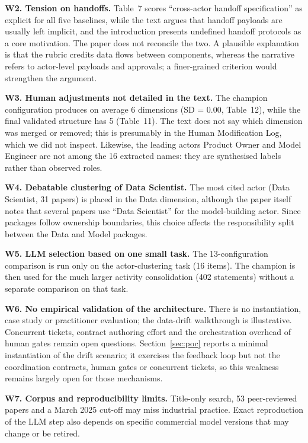 \documentclass[11pt,a4paper]{article}
\begin{document}
\textbf{W2. Tension on handoffs.} Table~7 scores ``cross-actor handoff specification'' as explicit for all five baselines, while the text argues that handoff payloads are usually left implicit, and the introduction presents undefined handoff protocols as a core motivation. The paper does not reconcile the two. A plausible explanation is that the rubric credits data flows between components, whereas the narrative refers to actor-level payloads and approvals; a finer-grained criterion would strengthen the argument.

\textbf{W3. Human adjustments not detailed in the text.} The champion configuration produces on average 6 dimensions (SD = 0.00, Table~12), while the final validated structure has 5 (Table~11). The text does not say which dimension was merged or removed; this is presumably in the Human Modification Log, which we did not inspect. Likewise, the leading actors Product Owner and Model Engineer are not among the 16 extracted names: they are synthesised labels rather than observed roles.

\textbf{W4. Debatable clustering of Data Scientist.} The most cited actor (Data Scientist, 31 papers) is placed in the Data dimension, although the paper itself notes that several papers use ``Data Scientist'' for the model-building actor. Since packages follow ownership boundaries, this choice affects the responsibility split between the Data and Model packages.

\textbf{W5. LLM selection based on one small task.} The 13-configuration comparison is run only on the actor-clustering task (16 items). The champion is then used for the much larger activity consolidation (402 statements) without a separate comparison on that task.

\textbf{W6. No empirical validation of the architecture.} There is no instantiation, case study or practitioner evaluation; the data-drift walkthrough is illustrative. Concurrent tickets, contract authoring effort and the orchestration overhead of human gates remain open questions.
Section~\ref{sec:poc} reports a minimal instantiation of the drift scenario; it exercises the feedback loop but not the coordination contracts, human gates or concurrent tickets, so this weakness remains largely open for those mechanisms.

\textbf{W7. Corpus and reproducibility limits.} Title-only search, 53 peer-reviewed papers and a March 2025 cut-off may miss industrial practice. Exact reproduction of the LLM step also depends on specific commercial model versions that may change or be retired.
\end{document}
